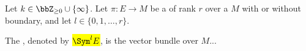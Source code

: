 \begin{definition}\label{definition:symmetric_power_of_a_vector_bundle_on_a_topological_manifold}
    Let $k \in \bbZ_{\geq 0} \cup \{\infty\}$. Let $\pi : E \to M$ be a  of rank $r$ over a  $M$ with or without boundary, and let $l \in \{0,1,\ldots,r\}.$

    The , denoted by \hl{$\Sym^l E$}, is the vector bundle over $M$...
\end{definition}